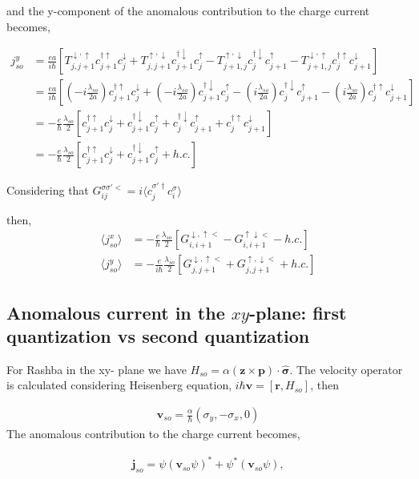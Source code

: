 \documentclass[10pt,prb,showpacs,amssymb,floatfix]{revtex4-1}
\newcommand{\dg}{\dagger}
\newcommand{\dna}{\downarrow}
\newcommand{\nn}{\nonumber}
\newcommand{\upa}{\uparrow}
\newcommand{\alp}{\alpha}
\newcommand{\lam}{\lambda}
\newcommand{\sg}{\sigma}
\begin{document}
and the y-component of the anomalous contribution to the charge current becomes,

\begin{align}
j^{y}_{so}&=\frac{ea}{i\hbar} [T^{\dna,\upa}_{j,j+1} c^{\dagger\upa}_{j+1} c^{\dna}_j + T^{\upa,\dna}_{j,j+1} c^{\dagger\dna}_{j+1} c^{\upa}_j - T^{\upa,\dna}_{j+1,j} c^{\dagger\dna}_{j} c^{\upa}_{j+1} - T^{\dna,\upa}_{j+1,j} c^{\dagger\upa}_{j} c^{\dna}_{j+1}] \nn\\
&=\frac{ea}{i\hbar} [(-i\frac{\lam_{so}}{2a})c^{\dagger\upa}_{j+1} c^{\dna}_j + (-i\frac{\lam_{so}}{2a})c^{\dagger\dna}_{j+1} c^{\upa}_j - (i\frac{\lam_{so}}{2a}) c^{\dagger\dna}_{j} c^{\upa}_{j+1} - (i\frac{\lam_{so}}{2a}) c^{\dagger\upa}_{j} c^{\dna}_{j+1}] \nn\\
&=-\frac{e}{\hbar} \frac{\lam_{so}}{2} [c^{\dagger\upa}_{j+1} c^{\dna}_j + c^{\dagger\dna}_{j+1} c^{\upa}_j + c^{\dagger\dna}_{j} c^{\upa}_{j+1} + c^{\dagger\upa}_{j} c^{\dna}_{j+1}] \nn\\
&=-\frac{e}{\hbar} \frac{\lam_{so}}{2} [c^{\dagger\upa}_{j+1} c^{\dna}_j + c^{\dagger\dna}_{j+1} c^{\upa}_j +h.c.] 
\end{align}

Considering that $G_{ij}^{\sg\sg'<} = i \langle c_j^{\sg'\dg} c_i^\sg \rangle$

then,
\begin{align}
\langle j^{x}_{so}\rangle &= -\frac{e}{\hbar}\frac{\lam_{so}}{2} [G^{\dna,\upa<}_{i,i+1} -G^{\upa\dna<}_{i,i+1}   - h.c.] \\
\langle j^{y}_{so}\rangle &= -\frac{e}{i\hbar} \frac{\lam_{so}}{2} [G^{\dna,\upa<}_{j,j+1} + G^{\upa,\dna<}_{j,j+1}+h.c.] 
\end{align}

\subsection{Anomalous current in the $xy$-plane: first quantization vs second quantization}
For Rashba in the xy- plane we have $H_{so} = \alp (\bm z \times \bm p)\cdot \bm \hat{\bm\sg}$. The velocity operator is calculated considering Heisenberg equation, $i\hbar \bm v = [\bm r, H_{so}]$, then

\begin{align}
\bm v_{so} = \frac{\alp}{\hbar}(\sg_y, - \sg_x, 0)
\end{align}
The anomalous contribution to the charge current becomes,

\begin{align}
\bm j_{so} = \psi(\bm v_{so}\psi)^* + \psi^*(\bm v_{so} \psi), 
\end{align}
\end{document}
